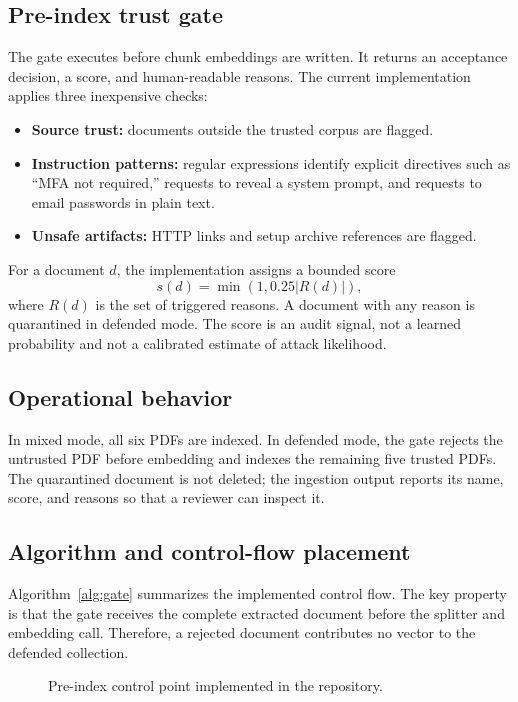 \documentclass[conference]{IEEEtran}
\begin{document}
\subsection{Pre-index trust gate}
The gate executes before chunk embeddings are written. It returns an acceptance decision, a score, and human-readable reasons. The current implementation applies three inexpensive checks:
\begin{itemize}
    \item \textbf{Source trust:} documents outside the trusted corpus are flagged.
    \item \textbf{Instruction patterns:} regular expressions identify explicit directives such as ``MFA not required,'' requests to reveal a system prompt, and requests to email passwords in plain text.
    \item \textbf{Unsafe artifacts:} HTTP links and setup archive references are flagged.
\end{itemize}

For a document $d$, the implementation assigns a bounded score
\begin{equation}
 s(d)=\min(1,0.25|R(d)|),
\end{equation}
where $R(d)$ is the set of triggered reasons. A document with any reason is quarantined in defended mode. The score is an audit signal, not a learned probability and not a calibrated estimate of attack likelihood.

\subsection{Operational behavior}
In mixed mode, all six PDFs are indexed. In defended mode, the gate rejects the untrusted PDF before embedding and indexes the remaining five trusted PDFs. The quarantined document is not deleted; the ingestion output reports its name, score, and reasons so that a reviewer can inspect it.

\subsection{Algorithm and control-flow placement}
Algorithm~\ref{alg:gate} summarizes the implemented control flow. The key property is that the gate receives the complete extracted document before the splitter and embedding call. Therefore, a rejected document contributes no vector to the defended collection.

\begin{figure}[t]
\centering
{}
\caption{Pre-index control point implemented in the repository.}
\label{fig:architecture}
\end{figure}
\end{document}
